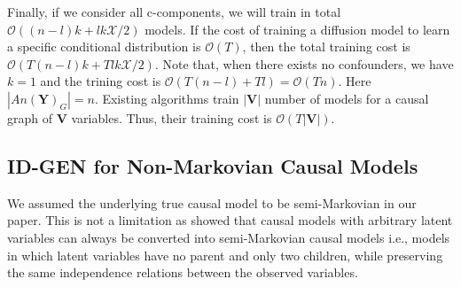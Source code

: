 \documentclass{article}
\newcommand{\blue}{\textcolor{blue}}
\newcommand{\X}{\mathbf{X}}
\newcommand{\Oc}{\mathcal{O}}
\newcommand{\Xc}{\mathcal{X}}
\newcommand{\Y}{\mathbf{Y}}
\newcommand{\V}{\mathbf{V}}
\newcommand{\vb}{\mathbf{v}}
\newcommand{\mbf}{\mathbf}
\newcommand{\idgen}{\text{ID-GEN}\xspace}
\theoremstyle{plain}
\theoremstyle{definition}
\theoremstyle{remark}
\begin{document}
 Finally, if we consider all c-components, we will train in total $\Oc((n-l)k + lk\Xc/2)$ models.
 If the cost of training a diffusion model to learn a specific conditional distribution is $\Oc(T)$, then the total training cost is 
 $\Oc(T(n-l)k + Tlk\Xc/2).$
Note that, when there exists no confounders, we have $k=1$ and the trining cost is $\Oc(T(n-l) + Tl)= \Oc(Tn)$. Here $|An(\Y)_G| = n$. 
Existing algorithms train $|\V|$ number of models for a causal graph of $\V$ variables. Thus, their training cost is $\Oc(T|\V|)$.

\subsection{ID-GEN for Non-Markovian Causal Models}
\label{sec:non-markov}
We assumed the underlying true causal model to be semi-Markovian in our paper. This is not a limitation as \citep{tian2002identification} showed that causal models with arbitrary latent variables can always be converted into semi-Markovian
causal models i.e., models in which latent variables have
no parent and only two children, while preserving the same independence relations between the observed variables. 

\end{document}
